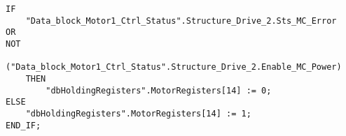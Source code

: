 
\begin{lstlisting}[language=ST,caption={Setting Motor Status}]
IF 
    "Data_block_Motor1_Ctrl_Status".Structure_Drive_2.Sts_MC_Error 
OR 
NOT  
    ("Data_block_Motor1_Ctrl_Status".Structure_Drive_2.Enable_MC_Power) 
    THEN
        "dbHoldingRegisters".MotorRegisters[14] := 0;
ELSE
    "dbHoldingRegisters".MotorRegisters[14] := 1;
END_IF;

\end{lstlisting}

